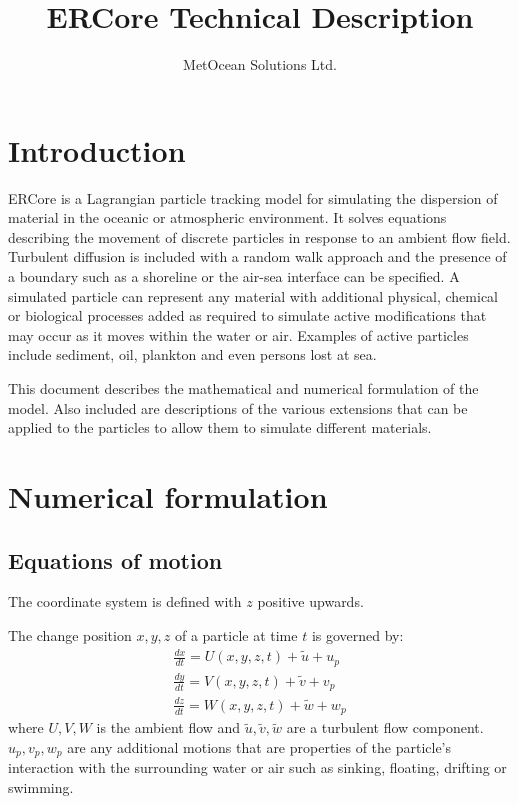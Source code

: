 \documentclass[a4paper]{article}
\title{ERCore Technical Description}
\author{MetOcean Solutions Ltd.}
\begin{document}
\maketitle


\section{Introduction}

ERCore is a Lagrangian particle tracking model for simulating the dispersion of material in the oceanic or atmospheric environment.
It solves equations describing the movement of discrete particles in response to an ambient flow field.
Turbulent diffusion is included with a random walk approach and the presence of a boundary such as a shoreline or the air-sea interface can be specified.
A simulated particle can represent any material with additional physical, chemical or biological processes added as required to simulate active modifications that may occur as it moves within the water or air.
Examples of active particles include sediment, oil, plankton and even persons lost at sea.

This document describes the mathematical and numerical formulation of the model.
Also included are descriptions of the various extensions that can be applied to the particles to allow them to simulate different materials.

\section{Numerical formulation}
\subsection{Equations of motion}
The coordinate system is defined with $z$ positive upwards.


The change position $x,y,z$ of a particle at time $t$ is governed by:\begin{align}
\frac{dx}{dt} = U(x,y,z,t)+\tilde{u}+u_p \\
\frac{dy}{dt} = V(x,y,z,t)+\tilde{v}+v_p \\ 
\frac{dz}{dt} = W(x,y,z,t)+\tilde{w}+w_p 
\end{align}
where $U,V,W$ is the ambient flow and $\tilde{u},\tilde{v},\tilde{w}$ are a turbulent flow component. $u_p,v_p,w_p$ are any additional motions that are properties of the particle's interaction with the surrounding water or air such as sinking, floating, drifting or swimming.
\end{document}
